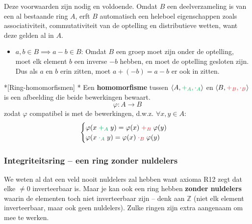 \textbf{} Deze voorwaarden zijn nodig en voldoende. Omdat $B$ een deelverzameling is van een al bestaande ring $A$, erft $B$ automatisch een heleboel eigenschappen zoals associativiteit, commutativiteit van de optelling en distributieve wetten, want deze gelden al in $A$. 
\begin{itemize}
    \item[$\rightarrow$] $a,b \in B \implies a-b \in B$: Omdat $B$ een groep moet zijn onder de optelling, moet elk element $b$ een inverse $-b$ hebben, en moet de optelling gesloten zijn. Dus als $a$ en $b$ erin zitten, moet $a + (-b) = a - b$ er ook in zitten.
\end{itemize}

\begin{nicedefinition}*[Ring-homomorfismen]
    \nextpart[]*
    Een \textcolor{PineGreen!75!black}{\textbf{homomorfisme}} tussen $\langle A, \textcolor{Green}{+_A, \cdot_A}\rangle$ en $\langle B, \textcolor{Red}{+_B, \cdot_B}\rangle$ is een afbeelding die beide bewerkingen bewaart.
    \begin{equation*}
        \varphi : A \to B
    \end{equation*}
    zodat $\varphi$ compatibel is met de bewerkingen, d.w.z. $\forall x,y \in A$:
    \begin{equation*}
        \begin{cases}
             \varphi(x\; \textcolor{Green}{+_A}\; y) = \varphi(x)\; \textcolor{Red}{+_B}\; \varphi(y) \\ 
             \varphi(x\; \textcolor{Green}{\cdot_A}\; y) = \varphi(x)\; \textcolor{Red}{\cdot_B}\; \varphi(y) \\
        \end{cases}
    \end{equation*}
\end{nicedefinition}

\subsubsection{Integriteitsring -- een ring zonder nuldelers}

We weten al dat een veld nooit nuldelers zal hebben want axioma R12 zegt dat elke $\neq0$ inverteerbaar is. Maar je kan ook een ring hebben \textbf{zonder nuldelers} waarin de elementen toch niet inverteerbaar zijn -- denk aan $\mathbb{Z}$ (niet elk element inverteerbaar, maar ook geen nuldelers). Zulke ringen zijn extra aangenaam om mee te werken.

